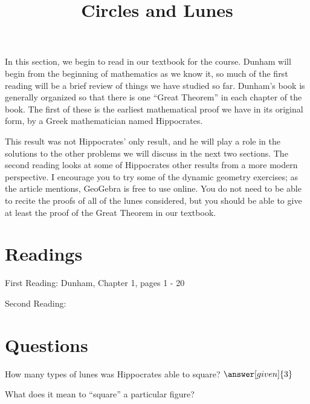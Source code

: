\documentclass{ximera}
\title{Circles and Lunes}
\begin{document}
\begin{abstract}
\end{abstract}
\maketitle

In this section, we begin to read in our textbook for the course.  Dunham will begin from the beginning of mathematics as we know it, so much of the first reading will be a brief review of things we have studied so far.  Dunham's book is generally organized so that there is one ``Great Theorem'' in each chapter of the book.  The first of these is the earliest mathematical proof we have in its original form, by a Greek mathematician named Hippocrates.  

This result was not Hippocrates' only result, and he will play a role in the solutions to the other problems we will discuss in the next two sections.  The second reading looks at some of Hippocrates other results from a more modern perspective.  I encourage you to try some of the dynamic geometry exercises; as the article mentions, GeoGebra is free to use online.  You do not need to be able to recite the proofs of all of the lunes considered, but you should be able to give at least the proof of the Great Theorem in our textbook.




\section{Readings}

First Reading: Dunham, Chapter 1, pages 1 - 20

Second Reading: 




\section{Questions}

\begin{question}
How many types of lunes was Hippocrates able to square? $\answer[given]{3}$
\end{question}

\begin{question}
What does it mean to ``square'' a particular figure?
\begin{multipleChoice}
\end{multipleChoice}
\end{question}


%
\end{document}
